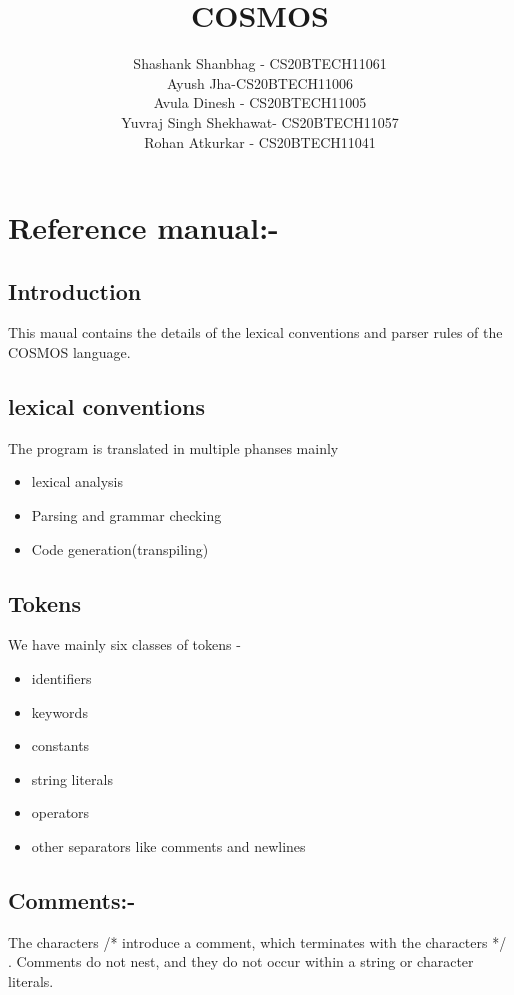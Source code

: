 \documentclass[11pt]{article}
\title{\Huge{\textbf{COSMOS}}}
\author{Shashank Shanbhag - CS20BTECH11061\\Ayush Jha-CS20BTECH11006\\Avula Dinesh - CS20BTECH11005\\Yuvraj Singh Shekhawat- CS20BTECH11057\\Rohan Atkurkar - CS20BTECH11041}
\begin{document}
\maketitle
\tableofcontents

\section{\Large{Reference manual:-}}
\subsection{Introduction}
This maual contains the details of the lexical conventions and parser rules of the COSMOS language.

\subsection{lexical conventions}
The program is translated in multiple phanses mainly
\begin{itemize}
\item lexical analysis
\item Parsing and grammar checking
\item Code generation(transpiling)
\end{itemize}
\subsection{Tokens}
We have mainly six classes of tokens -
\begin{itemize}
\item identifiers
\item  keywords
\item  constants
\item  string literals
\item  operators
\item other separators like comments and newlines 
\end{itemize}


\subsection{Comments:-}
The characters /* introduce a comment, which terminates with the characters */ . Comments
do not nest, and they do not occur within a string or character literals.
\end{document}

